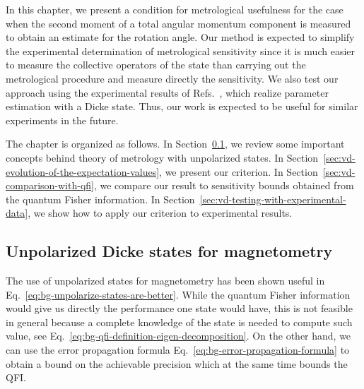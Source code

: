 In this chapter, we present a condition for metrological usefulness for the case when the second moment of a total angular momentum component is measured to obtain an estimate for the rotation angle.
Our method is expected to simplify the experimental determination of metrological sensitivity since it is much easier to measure the collective operators of the state than carrying out the metrological procedure and measure directly the sensitivity.
We also test our approach using the experimental results of Refs.~\cite{VD48,VD50}, which realize parameter estimation with a Dicke state.
Thus, our work is expected to be useful for similar experiments in the future.

The chapter is organized as follows.
In Section~\ref{sec:vd-unpolarized-states-magnetometry}, we review some important concepts behind theory of metrology with unpolarized states.
In Section~\ref{sec:vd-evolution-of-the-expectation-values}, we present our criterion.
In Section~\ref{sec:vd-comparison-with-qfi}, we compare our result to sensitivity bounds obtained from the quantum Fisher information.
In Section~\ref{sec:vd-testing-with-experimental-data}, we show how to apply our criterion to experimental results.

\subsection{Unpolarized Dicke states for magnetometry}
\label{sec:vd-unpolarized-states-magnetometry}

The use of unpolarized states for magnetometry has been shown useful in Eq.~\eqref{eq:bg-unpolarize-states-are-better}.
While the quantum Fisher information would give us directly the performance one state would have, this is not feasible in general because a complete knowledge of the state is needed to compute such value, see Eq.~\eqref{eq:bg-qfi-definition-eigen-decomposition}.
On the other hand, we can use the error propagation formula Eq.~\eqref{eq:bg-error-propagation-formula} to obtain a bound on the achievable precision which at the same time bounds the QFI.

